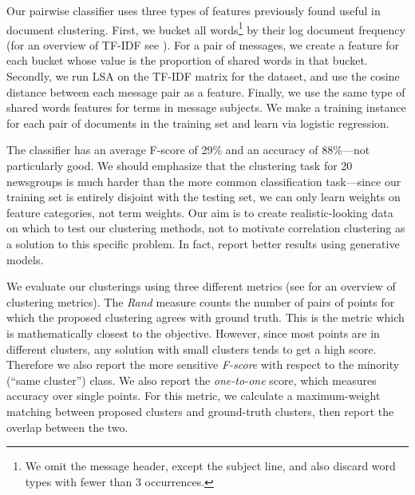\documentclass[11pt]{article}
\begin{document}
Our pairwise classifier uses three types of features previously found
useful in document clustering. First, we bucket all words\footnote{We
  omit the message header, except the subject line, and also discard
  word types with fewer than 3 occurrences.} by their log document
frequency (for an overview of TF-IDF see \cite{Joachims97a}). For a
pair of messages, we create a feature for each bucket whose value is
the proportion of shared words in that bucket. Secondly, we run LSA
\cite{Deerwester90} on the TF-IDF matrix for the dataset, and use the
cosine distance between each message pair as a feature. Finally, we
use the same type of shared words features for terms in message
subjects. We make a training instance for each pair of documents in
the training set and learn via logistic regression.


The classifier has an average F-score of 29\% and an accuracy of
88\%---not particularly good. We should emphasize that the clustering
task for 20 newsgroups is much harder than the more common
classification task---since our training set is entirely disjoint with
the testing set, we can only learn weights on feature categories, not
term weights. Our aim is to create realistic-looking data on which to
test our clustering methods, not to motivate correlation clustering as
a solution to this specific problem. In fact,  report
better results using generative models.

We evaluate our clusterings using three different metrics (see
 for an overview of clustering metrics). The {\em
  Rand} measure counts the number of pairs of points for which the
proposed clustering agrees with ground truth. This is the metric which
is mathematically closest to the objective. However, since most points
are in different clusters, any solution with small clusters tends to
get a high score. Therefore we also report the more sensitive {\em
  F-score} with respect to the minority (``same cluster'') class. We
also report the {\em one-to-one} score, which measures accuracy over
single points. For this metric, we calculate a maximum-weight matching
between proposed clusters and ground-truth clusters, then report the
overlap between the two.
\end{document}
